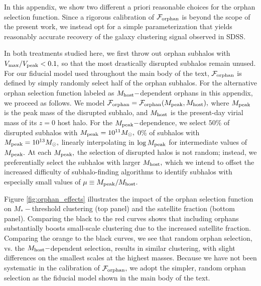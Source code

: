 \documentclass[usenatbib,usegraphicx,letterpaper]{mn2e}
\newcommand{\mstar}{M_{\ast}}
\newcommand{\mpeak}{M_{\rm peak}}
\newcommand{\mhost}{M_{\rm host}}
\newcommand{\msun}{M_\odot}
\begin{document}
In this appendix, we show two different a priori reasonable choices for the orphan selection function. Since a rigorous calibration of $\mathcal{F}_{\rm orphan}$ is beyond the scope of the present work, we instead opt for a simple parameterization that yields reasonably accurate recovery of the galaxy clustering signal observed in SDSS.

In both treatments studied here, we first throw out orphan subhalos with $V_{\rm max}/V_{\rm peak}<0.1,$ so that the most drastically disrupted subhalos remain unused. For our fiducial model used throughout the main body of the text, $\mathcal{F}_{\rm orphan}$ is defined by simply randomly select half of the orphan subhalos. For the alternative orphan selection function labeled as $M_{\rm host}-$dependent orphans in this appendix, we proceed as follows. We model $\mathcal{F}_{\rm orphan}=\mathcal{F}_{\rm orphan}(M_{\rm peak},M_{\rm host}),$ where $\mpeak$ is the peak mass of the disrupted subhalo, and $\mhost$ is the present-day virial mass of its $z=0$ host halo. For the $\mpeak-$dependence, we select $50\%$ of disrupted subhalos with $\mpeak=10^{11}\msun,$ $0\%$ of subhalos with $\mpeak=10^{13}\msun,$ linearly interpolating in $\log\mpeak$ for intermediate values of $\mpeak.$ At each $\mpeak,$ the selection of disrupted halos is not random; instead, we preferentially select the subhalos with larger $\mhost,$ which we intend to offset the increased difficulty of subhalo-finding algorithms to identify subhalos with especially small values of  $\mu\equiv\mpeak/\mhost.$

Figure \ref{fig:orphan_effects} illustrates the impact of the orphan selection function on $\mstar-$threshold clustering (top panel) and the satellite fraction (bottom panel). Comparing the black to the red curves shows that including orphans substantially boosts small-scale clustering due to the increased satellite fraction. Comparing the orange to the black curves, we see that random orphan selection, vs. the $M_{\rm host}-$dependent selection, results in similar clustering, with slight differences on the smallest scales at the highest masses. Because we have not been systematic in the calibration of $\mathcal{F}_{\rm orphan},$ we adopt the simpler, random orphan selection as the fiducial model shown in the main body of the text.
\end{document}
